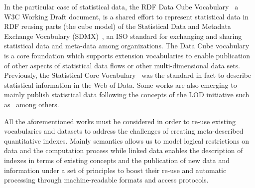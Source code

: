 
In the particular case of statistical data, the RDF Data Cube Vocabulary~\cite{rdf-data-cube}
a W3C Working Draft document, is a shared effort to represent statistical data in RDF reusing parts (the cube model) 
of the Statistical Data and Metadata Exchange Vocabulary (SDMX)~\cite{sdmx}, an ISO standard 
for exchanging and sharing statistical data and meta-data among organizations. The Data Cube vocabulary is a core 
foundation which supports extension vocabularies to enable publication of other aspects of statistical data flows or 
other multi-dimensional data sets. Previously, the Statistical Core Vocabulary~\cite{scovo} was the standard in fact to describe statistical information in the Web of Data.
Some works are also emerging to mainly publish statistical data following the concepts of the LOD initiative 
such as~\cite{DBLP:conf/semweb/ZapilkoM11,DBLP:journals/ijsc/SalasMBCMA12,DDI2013,DBLP:conf/dgo/FernandezMG11,webindexlod} 
among others.

All the aforementioned works must be considered in order to re-use existing vocabularies and datasets to address 
the challenges of creating meta-described quantitative indexes. Mainly semantics allows us to model logical restrictions 
on data and the computation process while linked data enables the description of indexes in terms of existing concepts and 
the publication of new data and information under a set of principles to boost their re-use and automatic 
processing through machine-readable formats and access protocols.

